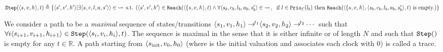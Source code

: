 \begin{definition}[Transition]
$\text{\texttt{Step}}{}(\langle s_{}, v_{}, h_{}\rangle, t)
\triangleq
\{\langle s_{}', v_{}', h_{}' \rangle |
  \exists \langle s_{}, c, l, a, s_{}' \rangle \rangle \in {\rightsquigarrow{}\!} \text{ s.t. } (\langle s_{}', v_{}', h_{}' \rangle \in \text{\texttt{Reach}}{}(\langle \{ s_{}, v_{}, h_{}\rangle, t) \land \\
      \forall \langle s_{b}, c_b, l_b, a_b, s_{b}' \rangle \in {\rightsquigarrow{}\!}{},\; \text{ if } l \in \text{\texttt{Prio}\textsubscript{\ensuremath{\mathcal{E}}}}{}(l_b) \text{ then }
\text{\texttt{Reach}}{}(\langle \{ s_{}, v_{}, h_{}\rangle, \langle s_{b}, c_b, l_b, a_b, s_{b}' \rangle, t) \text{ is empty.}
   )\}
$
\end{definition}

\begin{definition}
\label{def:formal_methods:trace2}
We consider a path to be a \emph{maximal} sequence of states/transitions
$\langle s_{1}, v_{1}, h_{1}\rangle
\to{}^{\!\!\!t_1} \langle s_{2},
v_{2}, h_{2}\rangle \to{}^{\!\!\!t_2} \cdots$ such that $
   \forall i%
      \langle \automatastate{i+1}, \automataenvironment{i+1}, \automataclockvals{i+1}\rangle \in \automatanext{}(\langle \automatastate{i}, \automataenvironment{i}, \automataclockvals{i}\rangle, t)
$. The sequence is maximal in the sense that it is either infinite or of length $N$ and such that $\text{\texttt{Step}}{}()$ is empty for any $t\in \mathbb{R}$.
A path starting from $ \langle
s_{\text{init}}{}, v_{0},  h_{0}\rangle$ (where
 is the initial valuation and 
associates each clock with 0) is called a trace.
\end{definition}

